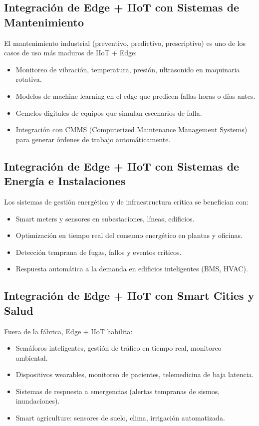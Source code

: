 ﻿\documentclass[12pt,a4paper,oneside]{article}
\begin{document}
\subsection{Integración de Edge + IIoT con Sistemas de Mantenimiento}

El mantenimiento industrial (preventivo, predictivo, prescriptivo) es uno de los casos de uso más maduros de IIoT + Edge:

\begin{itemize}[leftmargin=*]
    \item Monitoreo de vibración, temperatura, presión, ultrasonido en maquinaria rotativa.
    \item Modelos de machine learning en el edge que predicen fallas horas o días antes.
    \item Gemelos digitales de equipos que simulan escenarios de falla.
    \item Integración con CMMS (Computerized Maintenance Management Systems) para generar órdenes de trabajo automáticamente.
\end{itemize}

\subsection{Integración de Edge + IIoT con Sistemas de Energía e Instalaciones}

Los sistemas de gestión energética y de infraestructura crítica se benefician con:

\begin{itemize}[leftmargin=*]
    \item Smart meters y sensores en subestaciones, líneas, edificios.
    \item Optimización en tiempo real del consumo energético en plantas y oficinas.
    \item Detección temprana de fugas, fallos y eventos críticos.
    \item Respuesta automática a la demanda en edificios inteligentes (BMS, HVAC).
\end{itemize}

\subsection{Integración de Edge + IIoT con Smart Cities y Salud}

Fuera de la fábrica, Edge + IIoT habilita:

\begin{itemize}[leftmargin=*]
    \item Semáforos inteligentes, gestión de tráfico en tiempo real, monitoreo ambiental.
    \item Dispositivos wearables, monitoreo de pacientes, telemedicina de baja latencia.
    \item Sistemas de respuesta a emergencias (alertas tempranas de sismos, inundaciones).
    \item Smart agriculture: sensores de suelo, clima, irrigación automatizada.
\end{itemize}
\end{document}
